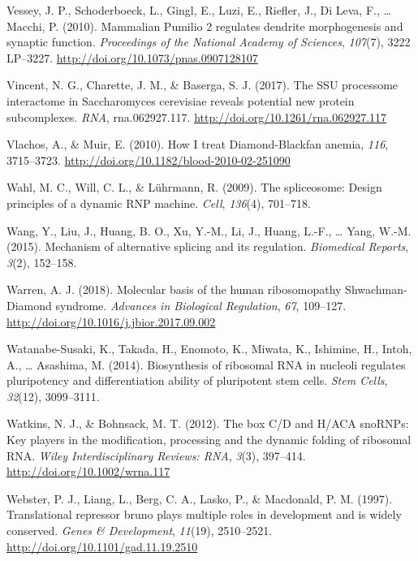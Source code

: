 \documentclass[12pt,twoside]{reedthesis}
\newlength{\cslhangindent}
\newenvironment{cslreferences}%
  {\setlength{\parindent}{0pt}%
  \everypar{\setlength{\hangindent}{\cslhangindent}}\ignorespaces}%
  {\par}
\begin{document}
\begin{cslreferences}
\leavevmode\hypertarget{ref-Vessey2010b}{}%
Vessey, J. P., Schoderboeck, L., Gingl, E., Luzi, E., Riefler, J., Di Leva, F., \ldots{} Macchi, P. (2010). Mammalian Pumilio 2 regulates dendrite morphogenesis and synaptic function. \emph{Proceedings of the National Academy of Sciences}, \emph{107}(7), 3222 LP--3227. \url{http://doi.org/10.1073/pnas.0907128107}

\leavevmode\hypertarget{ref-vincentSSUProcessomeInteractome2017}{}%
Vincent, N. G., Charette, J. M., \& Baserga, S. J. (2017). The SSU processome interactome in Saccharomyces cerevisiae reveals potential new protein subcomplexes. \emph{RNA}, rna.062927.117. \url{http://doi.org/10.1261/rna.062927.117}

\leavevmode\hypertarget{ref-Vlachos2010a}{}%
Vlachos, A., \& Muir, E. (2010). How I treat Diamond-Blackfan anemia, \emph{116}, 3715--3723. \url{http://doi.org/10.1182/blood-2010-02-251090}

\leavevmode\hypertarget{ref-Wahl2009}{}%
Wahl, M. C., Will, C. L., \& Lührmann, R. (2009). The spliceosome: Design principles of a dynamic RNP machine. \emph{Cell}, \emph{136}(4), 701--718.

\leavevmode\hypertarget{ref-Wang2015a}{}%
Wang, Y., Liu, J., Huang, B. O., Xu, Y.-M., Li, J., Huang, L.-F., \ldots{} Yang, W.-M. (2015). Mechanism of alternative splicing and its regulation. \emph{Biomedical Reports}, \emph{3}(2), 152--158.

\leavevmode\hypertarget{ref-warrenMolecularBasisHuman2018}{}%
Warren, A. J. (2018). Molecular basis of the human ribosomopathy Shwachman-Diamond syndrome. \emph{Advances in Biological Regulation}, \emph{67}, 109--127. \url{http://doi.org/10.1016/j.jbior.2017.09.002}

\leavevmode\hypertarget{ref-WatanabeSusaki2014a}{}%
Watanabe-Susaki, K., Takada, H., Enomoto, K., Miwata, K., Ishimine, H., Intoh, A., \ldots{} Asashima, M. (2014). Biosynthesis of ribosomal RNA in nucleoli regulates pluripotency and differentiation ability of pluripotent stem cells. \emph{Stem Cells}, \emph{32}(12), 3099--3111.

\leavevmode\hypertarget{ref-Watkins2012b}{}%
Watkins, N. J., \& Bohnsack, M. T. (2012). The box C/D and H/ACA snoRNPs: Key players in the modification, processing and the dynamic folding of ribosomal RNA. \emph{Wiley Interdisciplinary Reviews: RNA}, \emph{3}(3), 397--414. \url{http://doi.org/10.1002/wrna.117}

\leavevmode\hypertarget{ref-Webster1997a}{}%
Webster, P. J., Liang, L., Berg, C. A., Lasko, P., \& Macdonald, P. M. (1997). Translational repressor bruno plays multiple roles in development and is widely conserved. \emph{Genes \& Development}, \emph{11}(19), 2510--2521. \url{http://doi.org/10.1101/gad.11.19.2510}


\end{cslreferences}
\end{document}

